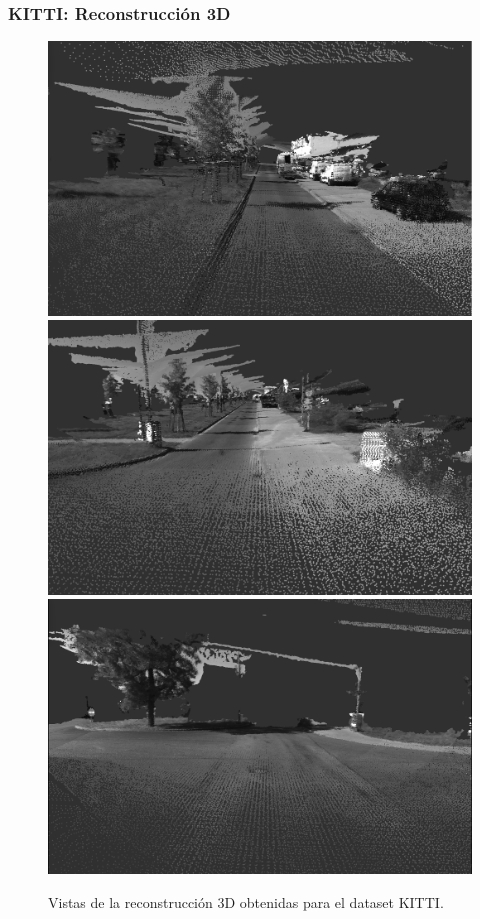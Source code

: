 \documentclass[compress]{beamer}
\begin{document}
\begin{frame}
	\frametitle{KITTI: Reconstrucción 3D}
\begin{figure}[!htb]
	\centering
	{\includegraphics[width=0.32\columnwidth]{./images/kitti_3d_1}%
		\label{kitti_3d_1}}
	\hfil
	{\includegraphics[width=0.32\columnwidth]{./images/kitti_3d_2}%
		\label{kitti_3d_2}}
	\hfil
	{\includegraphics[width=0.32\columnwidth]{./images/kitti_3d_3}%
		\label{kitti_3d_3}}
	\caption{Vistas de la reconstrucción 3D obtenidas para el dataset KITTI.}
	\label{fig:kitti_reconstructions}
\end{figure}
\end{frame}
\end{document}
